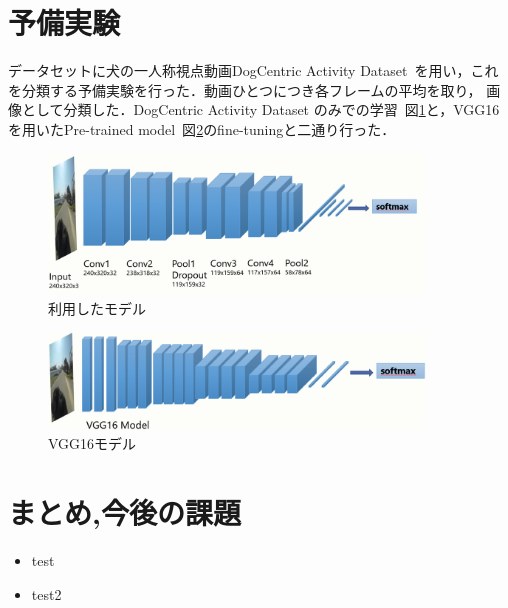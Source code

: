 \documentclass[twocolumn, a4paper]{UECIEresume}
\begin{document}
\section{予備実験}
データセットに犬の一人称視点動画DogCentric Activity Dataset~\cite{yumi2014first}を用い，これを分類する予備実験を行った．動画ひとつにつき各フレームの平均を取り，
画像として分類した．DogCentric Activity Dataset のみでの学習~図\ref{model}と，VGG16\cite{vgg16}を用いたPre-trained model~図\ref{vgg16model}のfine-tuningと二通り行った．
\begin{figure}[b]
 \includegraphics[width=10cm]{./Img/usemodel.eps}
 \caption{利用したモデル}
 \label{model}
\end{figure}
\begin{figure}[b]
 \includegraphics[width=10cm]{./Img/vgg16model.eps}
 \caption{VGG16モデル}
 \label{vgg16model}
\end{figure}

\section{まとめ,今後の課題}
\begin{itemize}
  \item{test}
  \item{test2}
\end{itemize}

\begin{footnotesize}


\end{footnotesize}
\end{document}
